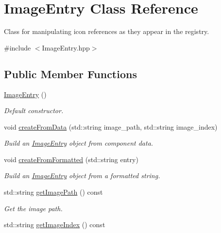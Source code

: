 \hypertarget{class_image_entry}{}\section{Image\+Entry Class Reference}
\label{class_image_entry}


Class for manipulating icon references as they appear in the registry.  




{\ttfamily \#include $<$Image\+Entry.\+hpp$>$}

\subsection*{Public Member Functions}
\begin{DoxyCompactItemize}
\item 
\hypertarget{class_image_entry_a38da928b7b3cf2aba92dcd68e247be02}{}\hyperlink{class_image_entry_a38da928b7b3cf2aba92dcd68e247be02}{Image\+Entry} ()\label{class_image_entry_a38da928b7b3cf2aba92dcd68e247be02}

\begin{DoxyCompactList}\small\item\em Default constructor. \end{DoxyCompactList}\item 
void \hyperlink{class_image_entry_a8e54a47819f25e6ee7e76273503b8744}{create\+From\+Data} (std\+::string image\+\_\+path, std\+::string image\+\_\+index)
\begin{DoxyCompactList}\small\item\em Build an \hyperlink{class_image_entry}{Image\+Entry} object from component data. \end{DoxyCompactList}\item 
void \hyperlink{class_image_entry_afe824b1530ab4b33ece3132b2e0a78e8}{create\+From\+Formatted} (std\+::string entry)
\begin{DoxyCompactList}\small\item\em Build an \hyperlink{class_image_entry}{Image\+Entry} object from a formatted string. \end{DoxyCompactList}\item 
\hypertarget{class_image_entry_acc882273f2d2c87d742f01efc5807bf5}{}std\+::string \hyperlink{class_image_entry_acc882273f2d2c87d742f01efc5807bf5}{get\+Image\+Path} () const \label{class_image_entry_acc882273f2d2c87d742f01efc5807bf5}

\begin{DoxyCompactList}\small\item\em Get the image path. \end{DoxyCompactList}\item 
\hypertarget{class_image_entry_a4a621dcaffe09aee7ada966d46705cbc}{}std\+::string \hyperlink{class_image_entry_a4a621dcaffe09aee7ada966d46705cbc}{get\+Image\+Index} () const \label{class_image_entry_a4a621dcaffe09aee7ada966d46705cbc}


\end{DoxyCompactItemize}
